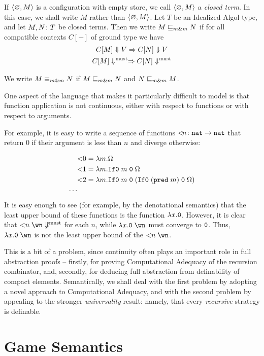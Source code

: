\documentclass[sigplan,10pt,review]{acmart}\settopmatter{printfolios=true,printccs=false,printacmref=false}
\begin{document}
If $\langle \varnothing , M \rangle$ is a configuration with empty store, we call $\langle \varnothing , M \rangle$ a \emph{closed term}.  
In this case, we shall write $M$ rather than $\langle \varnothing , M \rangle$.
Let $T$ be an Idealized Algol type, and let $M,N\colon T$ be closed terms.
Then we write $M\sqsubseteq_{m\&m} N$ if for all compatible contexts $C[-]$ of ground type we have
\begin{gather*}
  C[M]\Downarrow V \Rightarrow C[N] \Downarrow V\\
  C[M]\Downarrow^{\text{must}} \Rightarrow C[N] \Downarrow^{\text{must}}
\end{gather*}

We write $M\equiv_{m\&m} N$ if $M\sqsubseteq_{m\&m} N$ and $N\sqsubseteq_{m\&m} M$.

One aspect of the language that makes it particularly difficult to model is that function application is not continuous, either with respect to functions or with respect to arguments.  

For example, it is easy to write a sequence of functions ${<}\!n \colon {\mathtt{nat}} \to {\mathtt{nat}}$ that return $0$ if their argument is less than $n$ and diverge otherwise:

\begin{align*}
  &{<}0 = \lambda m.\Omega \\
  &{<}1 = \lambda m.{\mathtt{If0}\;} m\;{\mathtt{0}}\;\Omega \\
  &{<}2 = \lambda m.{\mathtt{If0}\;} m\;{\mathtt{0}}\;({\mathtt{If0}\;} ({\mathtt{pred\;}} m)\;{\mathtt{0}}\;\Omega)\\
  \cdots
\end{align*}
It is easy enough to see (for example, by the denotational semantics) that the least upper bound of these functions is the function $\lambda x.{\mathtt{0}}$.  
However, it is clear that ${<}n\;\wn\not\mustconverge$ for each $n$, while $\lambda x.\0\;\wn$ must converge to ${\mathtt{0}}$.  
Thus, $\lambda x.\0\;\wn$ is not the least upper bound of the ${<}n\;\wn$.

This is a bit of a problem, since continuity often plays an important role in full abstraction proofs -- firstly, for proving Computational Adequacy of the recursion combinator, and, secondly, for deducing full abstraction from definability of compact elements.
Semantically, we shall deal with the first problem by adopting a novel approach to Computational Adequacy, and with the second problem by appealing to the stronger \emph{universality} result: namely, that every \emph{recursive} strategy is definable.

\section{Game Semantics}
\end{document}
